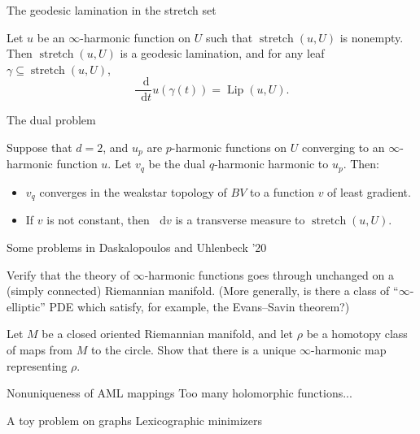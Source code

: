 \documentclass[10pt]{beamer}
\newcommand*\dif{\mathop{}\!\mathrm{d}}
\DeclareMathOperator{\Lip}{Lip}
\DeclareMathOperator{\Stretch}{stretch}
\begin{document}
\begin{frame}{The geodesic lamination in the stretch set}
\begin{theorem}
Let $u$ be an $\infty$-harmonic function on $U$ such that $\Stretch(u, U)$ is nonempty.
Then $\Stretch(u, U)$ is a geodesic lamination, and for any leaf $\gamma \subseteq \Stretch(u, U)$,
$$\frac{\dif}{\dif t} u(\gamma(t)) = \Lip(u, U).$$
\end{theorem}
\end{frame}

\begin{frame}{The dual problem}
\begin{theorem}
Suppose that $d = 2$, and $u_p$ are $p$-harmonic functions on $U$ converging to an $\infty$-harmonic function $u$.
Let $v_q$ be the dual $q$-harmonic harmonic to $u_p$.
Then:
\begin{itemize}
\item $v_q$ converges in the weakstar topology of $BV$ to a function $v$ of least gradient.
\item If $v$ is not constant, then $\dif v$ is a transverse measure to $\Stretch(u, U)$.
\end{itemize}
\end{theorem}
\end{frame}

\begin{frame}{Some problems in Daskalopoulos and Uhlenbeck '20}
\begin{problem}
Verify that the theory of $\infty$-harmonic functions goes through unchanged on a (simply connected) Riemannian manifold.
(More generally, is there a class of ``$\infty$-elliptic'' PDE which satisfy, for example, the Evans--Savin theorem?)
\end{problem}

\begin{problem}
Let $M$ be a closed oriented Riemannian manifold, and let $\rho$ be a homotopy class of maps from $M$ to the circle.
Show that there is a unique $\infty$-harmonic map representing $\rho$.
\end{problem}
\end{frame}

\begin{frame}{Nonuniqueness of AML mappings}
    Too many holomorphic functions...
\end{frame}

\begin{frame}{A toy problem on graphs}
    Lexicographic minimizers
\end{frame}
\end{document}
